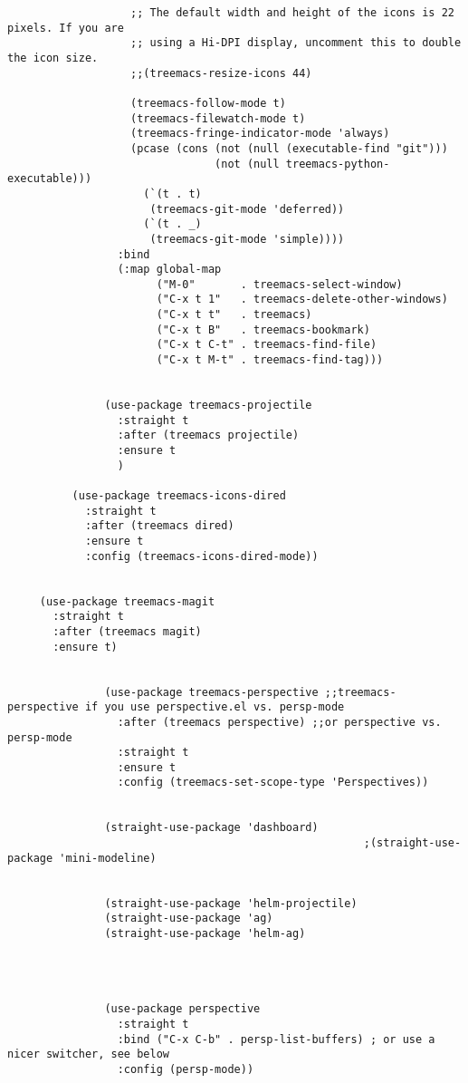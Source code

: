 \documentclass[11pt]{article}
\begin{document}
\begin{verbatim}
                   ;; The default width and height of the icons is 22 pixels. If you are
                   ;; using a Hi-DPI display, uncomment this to double the icon size.
                   ;;(treemacs-resize-icons 44)

                   (treemacs-follow-mode t)
                   (treemacs-filewatch-mode t)
                   (treemacs-fringe-indicator-mode 'always)
                   (pcase (cons (not (null (executable-find "git")))
                                (not (null treemacs-python-executable)))
                     (`(t . t)
                      (treemacs-git-mode 'deferred))
                     (`(t . _)
                      (treemacs-git-mode 'simple))))
                 :bind
                 (:map global-map
                       ("M-0"       . treemacs-select-window)
                       ("C-x t 1"   . treemacs-delete-other-windows)
                       ("C-x t t"   . treemacs)
                       ("C-x t B"   . treemacs-bookmark)
                       ("C-x t C-t" . treemacs-find-file)
                       ("C-x t M-t" . treemacs-find-tag)))


               (use-package treemacs-projectile
                 :straight t
                 :after (treemacs projectile)
                 :ensure t
                 )

          (use-package treemacs-icons-dired
            :straight t
            :after (treemacs dired)
            :ensure t
            :config (treemacs-icons-dired-mode))


     (use-package treemacs-magit
       :straight t
       :after (treemacs magit)
       :ensure t)


               (use-package treemacs-perspective ;;treemacs-perspective if you use perspective.el vs. persp-mode
                 :after (treemacs perspective) ;;or perspective vs. persp-mode
                 :straight t
                 :ensure t
                 :config (treemacs-set-scope-type 'Perspectives)) 


               (straight-use-package 'dashboard)
                                                       ;(straight-use-package 'mini-modeline)


               (straight-use-package 'helm-projectile) 
               (straight-use-package 'ag)      
               (straight-use-package 'helm-ag) 




               (use-package perspective
                 :straight t
                 :bind ("C-x C-b" . persp-list-buffers) ; or use a nicer switcher, see below
                 :config (persp-mode)) 




\end{verbatim}
\end{document}
